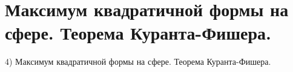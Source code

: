 \section{
 Максимум квадратичной формы на сфере. Теорема Куранта-Фишера.
}

4) Максимум квадратичной формы на сфере. Теорема Куранта-Фишера.
